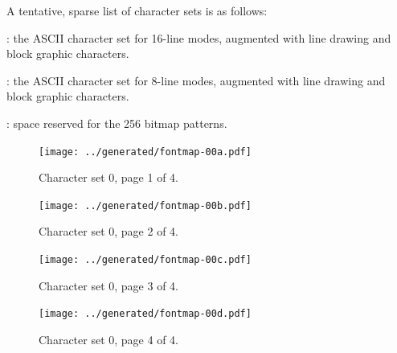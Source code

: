 A tentative, sparse list of character sets is as follows:

\begin{description}

: the ASCII character set for 16-line modes,
augmented with line drawing and block graphic characters.

: the ASCII character set for 8-line modes,
augmented with line drawing and block graphic characters.

: space reserved for the 256 bitmap patterns.
\end{description}

\begin{figure}
  \centering
  \texttt{[image: ../generated/fontmap-00a.pdf]}
  \caption{Character set 0, page 1 of 4.}
\end{figure}

\begin{figure}
  \centering
  \texttt{[image: ../generated/fontmap-00b.pdf]}
  \caption{Character set 0, page 2 of 4.}
\end{figure}

\begin{figure}
  \centering
  \texttt{[image: ../generated/fontmap-00c.pdf]}
  \caption{Character set 0, page 3 of 4.}
\end{figure}

\begin{figure}
  \centering
  \texttt{[image: ../generated/fontmap-00d.pdf]}
  \caption{Character set 0, page 4 of 4.}
\end{figure}




